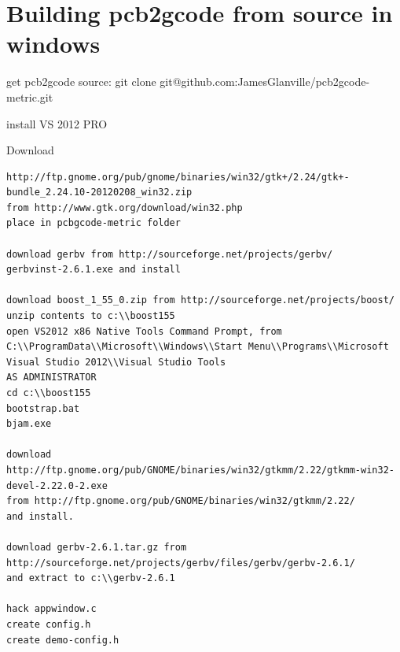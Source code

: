 \documentclass[a4paper,11pt]{article}  %
\begin{document}
\section{Building pcb2gcode from source in windows}

get pcb2gcode source:
git clone git@github.com:JamesGlanville/pcb2gcode-metric.git

install VS 2012 PRO

Download \begin{verbatim}http://ftp.gnome.org/pub/gnome/binaries/win32/gtk+/2.24/gtk+-bundle_2.24.10-20120208_win32.zip
from http://www.gtk.org/download/win32.php
place in pcbgcode-metric folder

download gerbv from http://sourceforge.net/projects/gerbv/
gerbvinst-2.6.1.exe and install

download boost_1_55_0.zip from http://sourceforge.net/projects/boost/
unzip contents to c:\\boost155
open VS2012 x86 Native Tools Command Prompt, from C:\\ProgramData\\Microsoft\\Windows\\Start Menu\\Programs\\Microsoft Visual Studio 2012\\Visual Studio Tools
AS ADMINISTRATOR
cd c:\\boost155
bootstrap.bat
bjam.exe

download http://ftp.gnome.org/pub/GNOME/binaries/win32/gtkmm/2.22/gtkmm-win32-devel-2.22.0-2.exe
from http://ftp.gnome.org/pub/GNOME/binaries/win32/gtkmm/2.22/
and install.

download gerbv-2.6.1.tar.gz from http://sourceforge.net/projects/gerbv/files/gerbv/gerbv-2.6.1/
and extract to c:\\gerbv-2.6.1

hack appwindow.c
create config.h
create demo-config.h
\end{verbatim}
\end{document}
